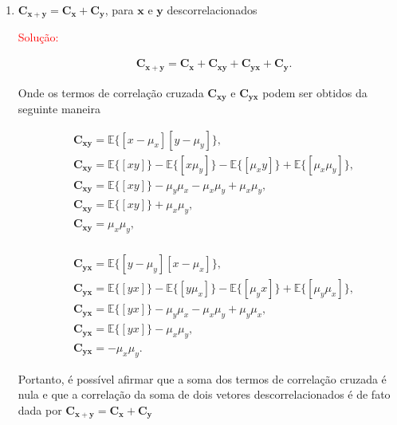 \documentclass[a4paper,10pt]{article}
\begin{document}
\begin{enumerate}
\begin{enumerate}
					\item $\mathbf{C}_{\mathbf{x} + \mathbf{y}} = \mathbf{C}_{\mathbf{x}} +
					\mathbf{C}_{\mathbf{y}}$, para $\mathbf{x}$ e $\mathbf{y}$ descorrelacionados
					
						\textcolor{red}{Solução:}
						
						\begin{align}
							&\mathbf{C}_{\mathbf{x} + \mathbf{y}} = \mathbf{C}_{\mathbf{x}} + \mathbf{C}_{\mathbf{xy}} + \mathbf{C}_{\mathbf{yx}} + \mathbf{C}_{\mathbf{y}}.
						\end{align}
						
						Onde os termos de correlação cruzada $\mathbf{C}_{\mathbf{xy}}$ e $\mathbf{C}_{\mathbf{yx}}$ podem ser obtidos  da seguinte maneira
						
						\begin{align}
							&\mathbf{C_{xy}} = \mathbb{E}\{[x - \mu_{x}][y - \mu_{y}]\}, \\
							&\mathbf{C_{xy}} = \mathbb{E}\{[xy]\} - \mathbb{E}\{[x\mu_{y}]\} - \mathbb{E}\{[\mu_{x} y]\} + \mathbb{E}\{[\mu_{x} \mu_{y}]\}, \\
							&\mathbf{C_{xy}} = \mathbb{E}\{[xy]\} - \mu_{y} \mu_{x} - \mu_{x} \mu_{y} + \mu_{x} \mu_{y}, \\
							&\mathbf{C_{xy}} = \mathbb{E}\{[xy]\} + \mu_{x} \mu_{y}, \\
							&\mathbf{C_{xy}} = \mu_{x} \mu_{y}, \\
						\end{align}
						
						\begin{align}
							&\mathbf{C_{yx}} = \mathbb{E}\{[y - \mu_{y}][x - \mu_{x}]\}, \\
							&\mathbf{C_{yx}} = \mathbb{E}\{[yx]\} - \mathbb{E}\{[y\mu_{x}]\} - \mathbb{E}\{[\mu_{y} x]\} + \mathbb{E}\{[\mu_{y} \mu_{x}]\}, \\
							&\mathbf{C_{yx}} = \mathbb{E}\{[yx]\} - \mu_{y} \mu_{x} - \mu_{x} \mu_{y} + \mu_{y} \mu_{x}, \\
							&\mathbf{C_{yx}} = \mathbb{E}\{[yx]\} - \mu_{x} \mu_{y}, \\
							&\mathbf{C_{yx}} = - \mu_{x} \mu_{y}.
						\end{align}
						
						Portanto, é possível afirmar que a soma dos termos de correlação cruzada é nula e que a correlação da soma de dois vetores descorrelacionados é de fato 
						dada por $\mathbf{C}_{\mathbf{x} + \mathbf{y}} = \mathbf{C}_{\mathbf{x}} + \mathbf{C}_{\mathbf{y}}$
						

\end{enumerate}
\end{enumerate}
\end{document}
